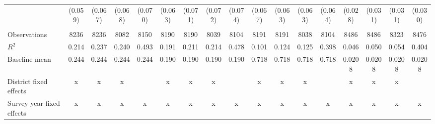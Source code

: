 {\begin{tabular}{l*{16}{c}}
                    &     (0.059)         &     (0.067)         &     (0.068)         &     (0.070)         &     (0.063)         &     (0.071)         &     (0.072)         &     (0.074)         &     (0.067)         &     (0.063)         &     (0.063)         &     (0.064)         &     (0.028)         &     (0.031)         &     (0.031)         &     (0.030)         \\
                    &                     &                     &                     &                     &                     &                     &                     &                     &                     &                     &                     &                     &                     &                     &                     &                     \\
\midrule
Observations        &        8236         &        8236         &        8082         &        8150         &        8190         &        8190         &        8039         &        8104         &        8191         &        8191         &        8038         &        8104         &        8486         &        8486         &        8323         &        8476         \\
\(R^{2}\)           &       0.214         &       0.237         &       0.240         &       0.493         &       0.191         &       0.211         &       0.214         &       0.478         &       0.101         &       0.124         &       0.125         &       0.398         &       0.046         &       0.050         &       0.054         &       0.404         \\
Baseline mean       &       0.244         &       0.244         &       0.244         &       0.244         &       0.190         &       0.190         &       0.190         &       0.190         &       0.718         &       0.718         &       0.718         &       0.718         &      0.0208         &      0.0208         &      0.0208         &      0.0208         \\
District fixed effects&           x         &           x         &           x         &                     &           x         &           x         &           x         &                     &           x         &           x         &           x         &                     &           x         &           x         &           x         &                     \\
Survey year fixed effects&           x         &           x         &           x         &           x         &           x         &           x         &           x         &           x         &           x         &           x         &           x         &           x         &           x         &           x         &           x         &           x         \\

\end{tabular}}
